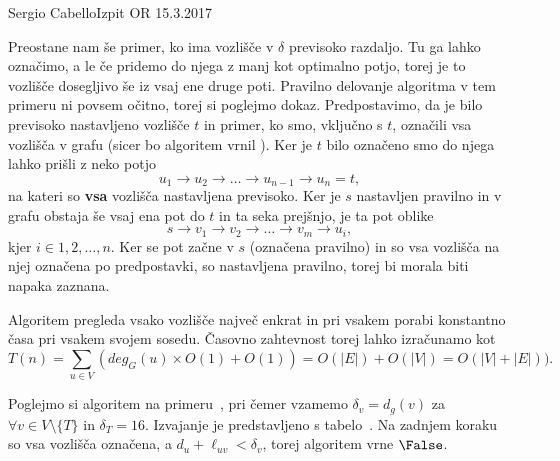 \begin{naloga}{Sergio Cabello}{Izpit OR 15.3.2017}
\begin{odgovor}
Preostane nam še primer, ko ima vozlišče v $\delta$ previsoko razdaljo.
Tu ga lahko označimo, a le če pridemo do njega z manj kot optimalno potjo, 
torej je to vozlišče dosegljivo še iz vsaj ene druge poti.
Pravilno delovanje algoritma v tem primeru ni povsem očitno, torej si poglejmo dokaz.
Predpostavimo, da je bilo previsoko nastavljeno vozlišče $t$ in primer, ko smo, vključno s $t$,
označili vsa vozlišča v grafu (sicer bo algoritem vrnil \False).
Ker je $t$ bilo označeno smo do njega lahko prišli z neko potjo 
$$u_1 \rightarrow u_2 \rightarrow \dots \rightarrow u_{n-1} \rightarrow u_n = t,$$
na kateri so {\bf vsa} vozlišča nastavljena previsoko.
Ker je $s$ nastavljen pravilno in v grafu obstaja še vsaj ena pot do $t$ in ta seka prejšnjo, je ta pot oblike
$$s \rightarrow v_1 \rightarrow v_2 \rightarrow \dots \rightarrow v_m \rightarrow u_i,$$
kjer $i \in {1, 2, \dots, n}$.
Ker se pot začne v $s$ (označena pravilno) in so vsa vozlišča na njej označena po predpostavki, so nastavljena pravilno,
torej bi morala biti napaka zaznana.\bigskip

Algoritem pregleda vsako vozlišče največ enkrat in pri vsakem porabi konstantno časa pri vsakem svojem sosedu.
Časovno zahtevnost torej lahko izračunamo kot 
$$T(n)  = \sum_{u \in V}\left(deg_G(u) \times O(1) + O(1)\right) = O(|E|) + O(|V|) = O(|V| + |E|)).$$
\bigskip

Poglejmo si algoritem na primeru~\fig, pri čemer vzamemo $\delta_v = d_g(v)$ za $ \forall v \in V \setminus \{T\}$ in $\delta_T = 16$.
Izvajanje je predstavljeno s tabelo~\tab.
Na zadnjem koraku so vsa vozlišča označena, a $d_u + \ell_{uv} < \delta_v$, torej algoritem vrne $\False$.
\begin{slika}
\pgfslika
{}
\end{slika}
\begin{tabela}
\end{tabela}

\end{odgovor}
\end{naloga}

